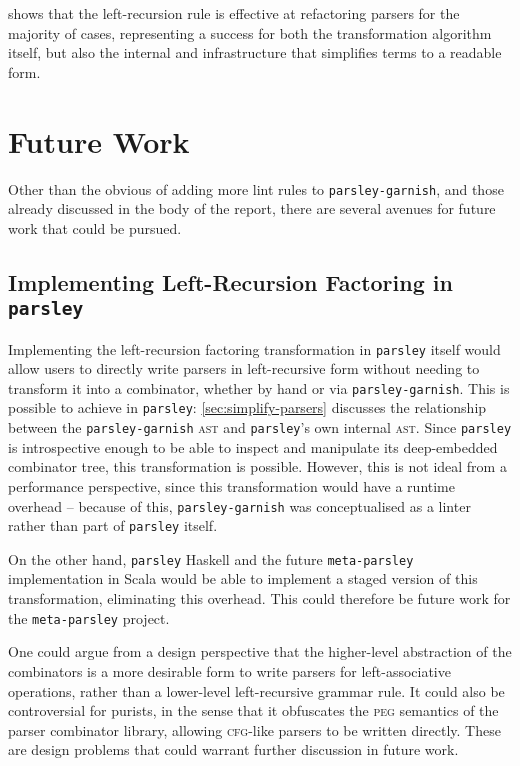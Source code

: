 \documentclass[../../main.tex]{subfiles}
\begin{document}
 shows that the left-recursion rule is effective at refactoring parsers for the majority of cases, representing a success for both the transformation algorithm itself, but also the internal  and  infrastructure that simplifies terms to a readable form.

\section{Future Work}
Other than the obvious of adding more lint rules to \texttt{parsley-garnish}, and those already discussed in the body of the report, there are several avenues for future work that could be pursued.

\subsection{Implementing Left-Recursion Factoring in \texttt{parsley}}
Implementing the left-recursion factoring transformation in \texttt{parsley} itself would allow users to directly write parsers in left-recursive form without needing to transform it into a  combinator, whether by hand or via \texttt{parsley-garnish}.
This is possible to achieve in \texttt{parsley}: \cref{sec:simplify-parsers} discusses the relationship between the \texttt{parsley-garnish}  \textsc{ast} and \texttt{parsley}'s own internal \textsc{ast}.
Since \texttt{parsley} is introspective enough to be able to inspect and manipulate its deep-embedded combinator tree, this transformation is possible.
However, this is not ideal from a performance perspective, since this transformation would have a runtime overhead -- because of this, \texttt{parsley-garnish} was conceptualised as a linter rather than part of \texttt{parsley} itself.

On the other hand, \texttt{parsley} Haskell and the future \texttt{meta-parsley} implementation in Scala would be able to implement a staged version of this transformation, eliminating this overhead.
This could therefore be future work for the \texttt{meta-parsley} project.

One could argue from a design perspective that the higher-level abstraction of the  combinators is a more desirable form to write parsers for left-associative operations, rather than a lower-level left-recursive grammar rule.
It could also be controversial for purists, in the sense that it obfuscates the \textsc{peg} semantics of the parser combinator library, allowing \textsc{cfg}-like parsers to be written directly.
These are design problems that could warrant further discussion in future work.
\end{document}
